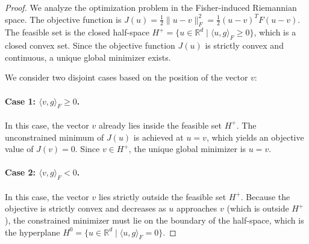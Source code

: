 \documentclass{article}
\theoremstyle{plain}
\theoremstyle{definition}
\theoremstyle{remark}
\begin{document}
\begin{proof}
We analyze the optimization problem in the Fisher-induced Riemannian space. The objective function is $J(u) = \frac{1}{2} \|u - v\|_F^2 = \frac{1}{2} (u - v)^T F (u - v)$. The feasible set is the closed half-space $H^+ = \{u \in \mathbb{R}^d \mid \langle u, g \rangle_F \ge 0\}$, which is a closed convex set. Since the objective function $J(u)$ is strictly convex and continuous, a unique global minimizer exists.

We consider two disjoint cases based on the position of the vector $v$:

\paragraph{Case 1: $\langle v, g \rangle_F \ge 0$.}
In this case, the vector $v$ already lies inside the feasible set $H^+$. The unconstrained minimum of $J(u)$ is achieved at $u = v$, which yields an objective value of $J(v) = 0$. Since $v \in H^+$, the unique global minimizer is $u = v$.

\paragraph{Case 2: $\langle v, g \rangle_F < 0$.}
In this case, the vector $v$ lies strictly outside the feasible set $H^+$. Because the objective is strictly convex and decreases as $u$ approaches $v$ (which is outside $H^+$), the constrained minimizer must lie on the boundary of the half-space, which is the hyperplane $H^0 = \{u \in \mathbb{R}^d \mid \langle u, g \rangle_F = 0\}$. 


\end{proof}
\end{document}
